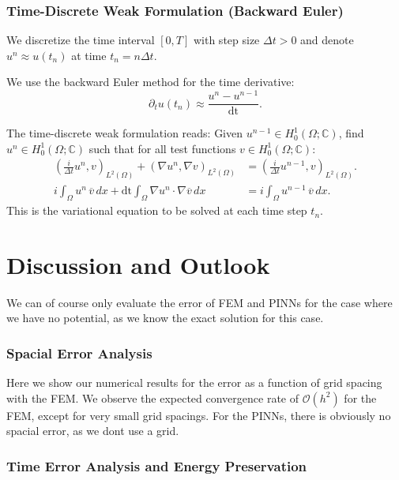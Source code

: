 \documentclass{article}
\theoremstyle{definition}
\theoremstyle{plain}
\theoremstyle{remark}
\newcommand{\dt}{\text{dt}}
\begin{document}
\subsubsection*{Time-Discrete Weak Formulation (Backward Euler)}

We discretize the time interval $[0,T]$ with step size $\Delta t > 0$ and denote $u^n \approx u(t_n)$ at time $t_n = n\Delta t$.

We use the backward Euler method for the time derivative:
\[
\partial_t u(t_n) \approx \frac{u^n - u^{n-1}}{\dt}.
\]

The time-discrete weak formulation reads:
Given $u^{n-1} \in H_0^1(\Omega; \mathbb{C})$, find $u^n \in H_0^1(\Omega; \mathbb{C})$ such that for all test functions $v \in H_0^1(\Omega; \mathbb{C})$:
\begin{align*}
\left( \frac{i}{\Delta t} u^n, v \right)_{L^2(\Omega)} + (\nabla u^n, \nabla v)_{L^2(\Omega)} &= \left( \frac{i}{\Delta t} u^{n-1}, v \right)_{L^2(\Omega)}.\\
i \int_{\Omega}  u^n \, \overline{v} \, dx 
+ \dt \int_{\Omega} \nabla u^n \cdot \nabla \overline{v} \, dx 
&= i \int_{\Omega}  u^{n-1} \, \overline{v} \, dx.
\end{align*}
This is the variational equation to be solved at each time step $t_n$.

\section{Discussion and Outlook}

We can of course only evaluate the error of FEM and PINNs for the case where we have no potential, as we know the exact solution for this case.

\subsubsection*{Spacial Error Analysis}

Here we show our numerical results for the error as a function of grid spacing with the FEM. We observe the expected convergence rate of $\mathcal{O}(h^2)$ for the FEM, except for very small grid spacings. For the PINNs, there is obviously no spacial error, as we dont use a grid.

\subsubsection*{Time Error Analysis and Energy Preservation}
\end{document}
